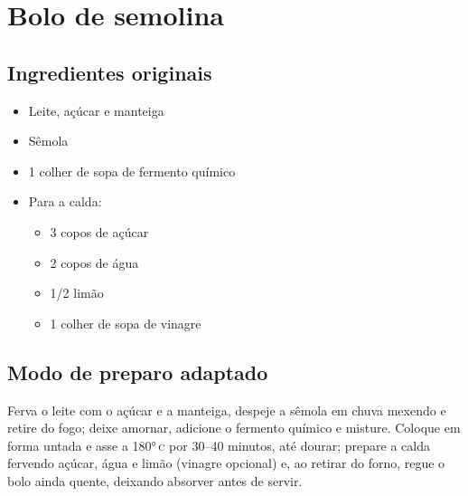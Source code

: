 \chapter{Bolo de semolina}

\section{Ingredientes originais}

\begin{itemize}
\item Leite, açúcar e manteiga
\item Sêmola
\item 1 colher de sopa de fermento químico
\item Para a calda:
	\begin{itemize}
	\item 3 copos de açúcar
	\item 2 copos de água
	\item 1/2 limão
	\item 1 colher de sopa de vinagre
	\end{itemize}
\end{itemize}

\section{Modo de preparo adaptado}

Ferva o leite com o açúcar e a manteiga, despeje a sêmola em chuva mexendo e retire do fogo; deixe amornar, adicione o fermento químico e misture. Coloque em forma untada e asse a 180°\,\textsc{c} por 30--40 minutos, até dourar; prepare a calda fervendo açúcar, água e limão (vinagre opcional) e, ao retirar do forno, regue o bolo ainda quente, deixando absorver antes de servir.